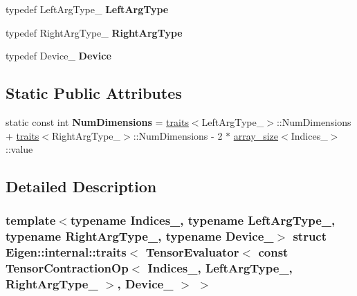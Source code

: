 \begin{DoxyCompactItemize}
typedef Left\+Arg\+Type\+\_\+ {\bfseries Left\+Arg\+Type}
\item 
\mbox{\label{struct_eigen_1_1internal_1_1traits_3_01_tensor_evaluator_3_01const_01_tensor_contraction_op_3_01d675ebf024b6201c69018a9924deb8c5_aca062cea9ef2e619685bd9fc769712d5}} 
typedef Right\+Arg\+Type\+\_\+ {\bfseries Right\+Arg\+Type}
\item 
\mbox{\label{struct_eigen_1_1internal_1_1traits_3_01_tensor_evaluator_3_01const_01_tensor_contraction_op_3_01d675ebf024b6201c69018a9924deb8c5_a3a7784e71b4ea5235ab49a896463c719}} 
typedef Device\+\_\+ {\bfseries Device}
\end{DoxyCompactItemize}
\subsection*{Static Public Attributes}
\begin{DoxyCompactItemize}
\item 
\mbox{\label{struct_eigen_1_1internal_1_1traits_3_01_tensor_evaluator_3_01const_01_tensor_contraction_op_3_01d675ebf024b6201c69018a9924deb8c5_aa4dcd992489c0be5bd3cd9206c37a398}} 
static const int {\bfseries Num\+Dimensions} = \hyperlink{struct_eigen_1_1internal_1_1traits}{traits}$<$Left\+Arg\+Type\+\_\+$>$\+::Num\+Dimensions + \hyperlink{struct_eigen_1_1internal_1_1traits}{traits}$<$Right\+Arg\+Type\+\_\+$>$\+::Num\+Dimensions -\/ 2 $\ast$ \hyperlink{struct_eigen_1_1internal_1_1array__size}{array\+\_\+size}$<$Indices\+\_\+$>$\+::value
\end{DoxyCompactItemize}


\subsection{Detailed Description}
\subsubsection*{template$<$typename Indices\+\_\+, typename Left\+Arg\+Type\+\_\+, typename Right\+Arg\+Type\+\_\+, typename Device\+\_\+$>$\newline
struct Eigen\+::internal\+::traits$<$ Tensor\+Evaluator$<$ const Tensor\+Contraction\+Op$<$ Indices\+\_\+, Left\+Arg\+Type\+\_\+, Right\+Arg\+Type\+\_\+ $>$, Device\+\_\+ $>$ $>$}




